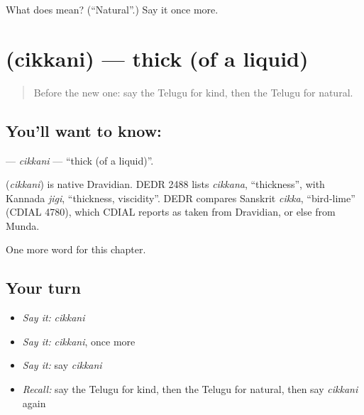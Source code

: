 \begin{tcolorbox}[breakable,colback=teal!4,colframe=teal!35!black,title={Before you move on}]
What does  mean? (\textquotedblleft{}Natural\textquotedblright{}.) Say it once more.
\end{tcolorbox}
\section[\texorpdfstring{\te{చిక్కని} (cikkani)}{చిక్కని (cikkani)}]{ (cikkani) — thick (of a liquid)}

\label{lesson:TE-C261-cikkani}



\begin{quote}
Before the new one: say the Telugu for kind, then the Telugu for natural.
\end{quote}

\subsection*{You'll want to know: }
\textbf{} — \emph{cikkani} — \textquotedblleft{}thick (of a liquid)\textquotedblright{}.

\begin{cousinweb}
\textbf{} (\emph{cikkani}) is native Dravidian. DEDR 2488 lists \emph{cikkana}, \textquotedblleft{}thickness\textquotedblright{}, with Kannada \emph{jigi}, \textquotedblleft{}thickness, viscidity\textquotedblright{}. DEDR compares Sanskrit \emph{cikka}, \textquotedblleft{}bird-lime\textquotedblright{} (CDIAL 4780), which CDIAL reports as taken from Dravidian, or else from Munda.
\end{cousinweb}

\begin{grammarlens}[title={What you've built}]
One more word for this chapter.
\end{grammarlens}

\subsection*{Your turn}
\begin{itemize}
\raggedright
  \item \emph{Say it:} \emph{cikkani}
  \item \emph{Say it:} \emph{cikkani}, once more
  \item \emph{Say it:} say \emph{cikkani}
  \item \emph{Recall:} say the Telugu for kind, then the Telugu for natural, then say \emph{cikkani} again
\end{itemize}

